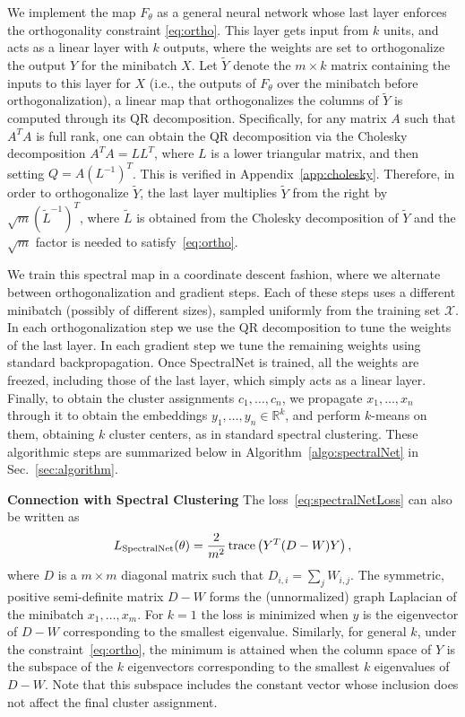 \documentclass{article} %
\DeclareMathOperator{\tr}{trace}
\begin{document}
We implement the map $F_\theta$ as a general neural network whose last layer enforces the orthogonality constraint \eqref{eq:ortho}. This layer gets input from $k$ units, and acts as a linear layer with $k$ outputs, where the weights are set to orthogonalize the output $Y$ for the minibatch $X$. Let  $\tilde{Y}$ denote the $m \times k$ matrix containing the inputs to this layer for $X$ (i.e., the outputs of $F_\theta$ over the minibatch before orthogonalization), a linear map that orthogonalizes the columns of $\tilde Y$ is computed through its QR decomposition.
Specifically, for any matrix $A$ such that $A^TA$ is full rank, one can obtain the QR decomposition via the Cholesky decomposition $A^TA = LL^T$, where $L$ is a lower triangular matrix, and then setting $Q = A\left(L^{-1}\right)^T$. This is verified in Appendix~\ref{app:cholesky}.
Therefore, in order to orthogonalize $\tilde{Y}$, the last layer multiplies $\tilde{Y}$ from the right by $\sqrt{m}\left(\tilde{L}^{-1}\right)^T$,  where $\tilde{L}$ is obtained from the Cholesky decomposition of $\tilde{Y}$ and the $\sqrt{m}$ factor is needed to satisfy~\eqref{eq:ortho}.

We train this spectral map in a coordinate descent fashion, where we alternate between orthogonalization and gradient steps. Each of these steps uses a different minibatch (possibly of different sizes), sampled uniformly from the training set $\mathcal{X}$. In each orthogonalization step we use the QR decomposition to tune the weights of the last layer.
In each gradient step we tune the remaining weights using standard backpropagation.
Once SpectralNet is trained, all the weights are freezed, including those of the last layer, which simply acts as a linear layer.
Finally, to obtain the cluster assignments $c_1,\ldots, c_n$, we propagate $x_1,\ldots, x_n$ through it to obtain the embeddings $y_1,\ldots,y_n \in \mathbb{R}^k$, and perform $k$-means on them, obtaining $k$ cluster centers, as in standard spectral clustering. These algorithmic steps are summarized below in Algorithm~\ref{algo:spectralNet} in Sec.~\ref{sec:algorithm}.


\noindent \textbf{Connection with Spectral Clustering} \quad
The loss~\eqref{eq:spectralNetLoss} can also be written as
\begin{equation}
L_\text{SpectralNet}(\theta) = \frac{2}{m^2}\tr \left(Y^T(D-W)Y\right),\notag
\end{equation}
where $D$ is a $m \times m$ diagonal matrix such that $D_{i,i} = \sum_j W_{i,j}$. The symmetric, positive semi-definite matrix $D-W$ forms the (unnormalized) graph Laplacian of the minibatch $x_1,\ldots, x_m$.
For $k=1$ the loss is minimized when $y$ is the eigenvector of $D-W$ corresponding to the smallest eigenvalue. Similarly, for general $k$, under the constraint~\eqref{eq:ortho}, the minimum is attained when the column space of $Y$ is the subspace of the $k$ eigenvectors corresponding to the smallest $k$ eigenvalues of $D-W$. Note that this subspace includes the constant vector whose inclusion does not affect the final cluster assignment.
\end{document}
